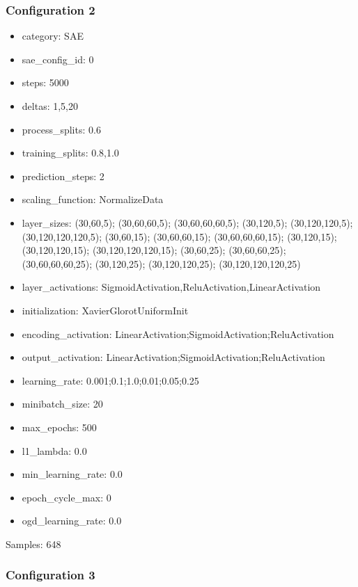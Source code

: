 \documentclass[a4paper,11pt,oneside]{article}
\theoremstyle{plain}
\theoremstyle{definition}
\begin{document}
\subsubsection{Configuration 2}\label{config2}
\begin{itemize}
	\item category: SAE
	\item sae\_config\_id: 0
	\item steps: 5000
	\item deltas: 1,5,20
	\item process\_splits: 0.6
	\item training\_splits: 0.8,1.0
	\item prediction\_steps: 2
	\item scaling\_function: NormalizeData
	\item layer\_sizes: (30,60,5); (30,60,60,5); (30,60,60,60,5); (30,120,5); (30,120,120,5); (30,120,120,120,5); (30,60,15); (30,60,60,15); (30,60,60,60,15); (30,120,15); (30,120,120,15); (30,120,120,120,15); (30,60,25); (30,60,60,25); (30,60,60,60,25); (30,120,25); (30,120,120,25); (30,120,120,120,25)
	\item layer\_activations: SigmoidActivation,ReluActivation,LinearActivation
	\item initialization: XavierGlorotUniformInit
	\item encoding\_activation: LinearActivation;SigmoidActivation;ReluActivation
	\item output\_activation: LinearActivation;SigmoidActivation;ReluActivation
	\item learning\_rate: 0.001;0.1;1.0;0.01;0.05;0.25
	\item minibatch\_size: 20
	\item max\_epochs: 500
	\item l1\_lambda: 0.0
	\item min\_learning\_rate: 0.0
	\item epoch\_cycle\_max: 0
	\item ogd\_learning\_rate: 0.0
\end{itemize}

Samples: 648

\subsubsection{Configuration 3}\label{config3}
\end{document}

